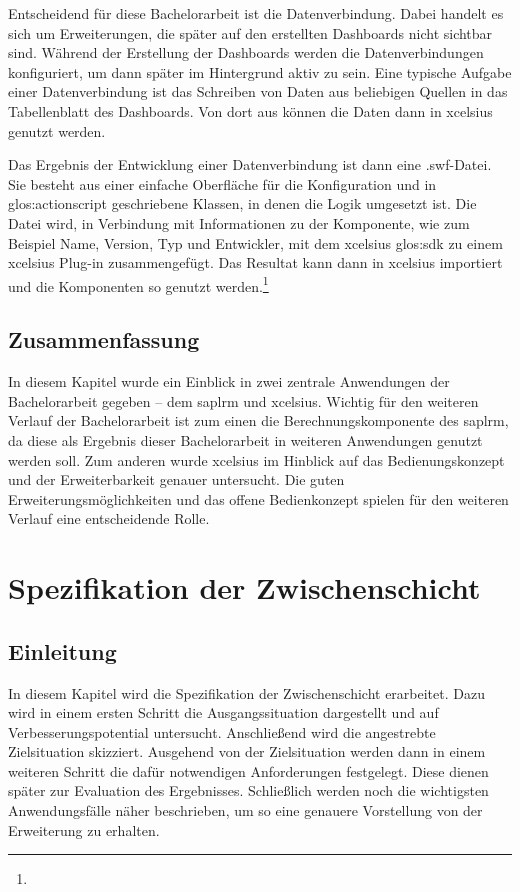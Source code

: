 \begin{onehalfspacing}
Entscheidend für diese Bachelorarbeit ist die Datenverbindung. Dabei handelt es sich um Erweiterungen, die später auf den erstellten Dashboards nicht sichtbar sind. Während der Erstellung der Dashboards werden die Datenverbindungen konfiguriert, um dann später im Hintergrund aktiv zu sein. Eine typische Aufgabe einer Datenverbindung ist das Schreiben von Daten aus beliebigen Quellen in das Tabellenblatt des Dashboards. Von dort aus können die Daten dann in \gls{xcelsius} genutzt werden.

Das Ergebnis der Entwicklung einer Datenverbindung ist dann eine .swf-Datei. Sie besteht aus einer einfache Oberfläche für die Konfiguration und in \gls{glos:actionscript} geschriebene Klassen, in denen die Logik umgesetzt ist. Die Datei wird, in Verbindung mit Informationen zu der Komponente, wie zum Beispiel Name, Version, Typ und Entwickler, mit dem \gls{xcelsius} \gls{glos:sdk} zu einem \gls{xcelsius} Plug-in zusammengefügt. Das Resultat kann dann in \gls{xcelsius} importiert und die Komponenten so genutzt werden.\footnote{ }

\section{Zusammenfassung}
In diesem Kapitel wurde ein Einblick in zwei zentrale Anwendungen der Bachelorarbeit gegeben -- dem \gls{saplrm} und \gls{xcelsius}. Wichtig für den weiteren Verlauf der Bachelorarbeit ist zum einen die Berechnungskomponente des \gls{saplrm}, da diese als Ergebnis dieser Bachelorarbeit in weiteren Anwendungen genutzt werden soll. Zum anderen wurde \gls{xcelsius} im Hinblick auf das Bedienungskonzept und der Erweiterbarkeit genauer untersucht. Die guten Erweiterungsmöglichkeiten und das offene Bedienkonzept spielen für den weiteren Verlauf eine entscheidende Rolle.

\chapter{Spezifikation der Zwischenschicht}
\label{sec:spezifikation}

\section{Einleitung}
In diesem Kapitel wird die Spezifikation der Zwischenschicht erarbeitet. Dazu wird in einem ersten Schritt die Ausgangssituation dargestellt und auf Verbesserungspotential untersucht. Anschließend wird die angestrebte Zielsituation skizziert. Ausgehend von der Zielsituation werden dann in einem weiteren Schritt die dafür notwendigen Anforderungen festgelegt. Diese dienen später zur Evaluation des Ergebnisses. Schließlich werden noch die wichtigsten Anwendungsfälle näher beschrieben, um so eine genauere Vorstellung von der Erweiterung zu erhalten.


\end{onehalfspacing}
